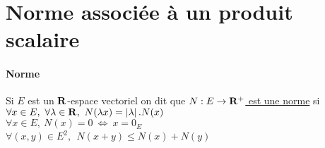 	\section{Norme associée à un produit scalaire}
		\traitd
		\paragraph{Norme}
			Si $E$ est un ${\mathbf{R}}$-espace vectoriel on dit que \uline{$N : E\to {\mathbf{R}}^+$ est une norme} si \\
			\hspace*{2cm} \un $\forall x\in E ,~\forall \lambda\in {\mathbf{R}} ,~N(\lambda x) = \left\vert \lambda \right\vert.N(x)$\\
			\hspace*{2cm} \deux $\forall x\in E,~ N(x) = 0~\Leftrightarrow~ x=0_E$\\
			\hspace*{2cm} \trois $\forall (x,y) \in E^2 ,~ ~N(x+y)\leqslant N(x)+N(y)$
			\trait ${}$ \vspace*{-1.2cm} \traitd
